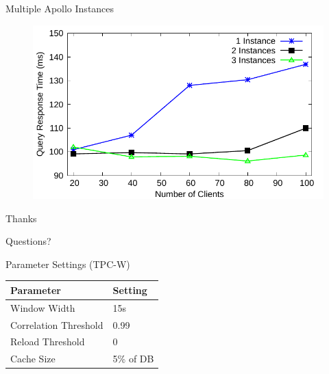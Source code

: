 \documentclass[10pt]{beamer}
\begin{document}
\begin{frame}[fragile]{Multiple Apollo Instances}
    \begin{figure}
        \center
        \includegraphics[scale=0.7]{apollo_scalability_curve}
    \end{figure}
\end{frame}

\begin{frame}[fragile]{Thanks}
\begin{centering}
Questions?
\end{centering}
\end{frame}

\begin{frame}[fragile]{Parameter Settings (TPC-W)}
\begin{table}
\centering
\begin{tabular}{ll}
Parameter & Setting \\
\toprule
Window Width & 15s \\
Correlation Threshold & 0.99 \\
Reload Threshold & 0 \\
Cache Size & 5\% of DB \\
\bottomrule
\end{tabular}
\end{table}

\end{frame}
\end{document}
